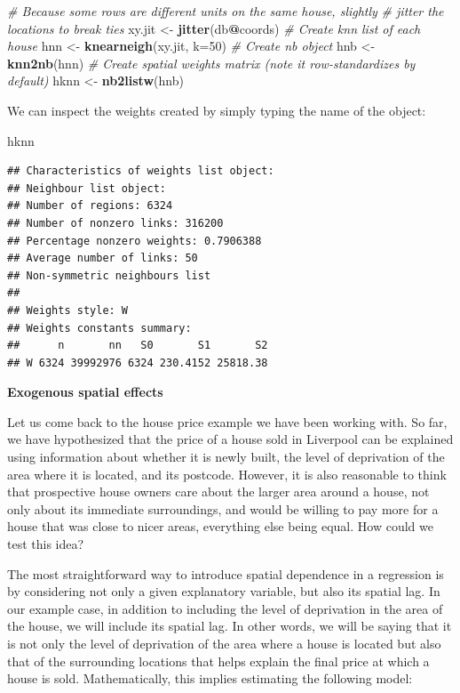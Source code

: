 \documentclass[]{book}
\newenvironment{Shaded}{\begin{snugshade}}{\end{snugshade}}
\newcommand{\KeywordTok}[1]{\textcolor[rgb]{0.13,0.29,0.53}{\textbf{#1}}}
\newcommand{\DataTypeTok}[1]{\textcolor[rgb]{0.13,0.29,0.53}{#1}}
\newcommand{\DecValTok}[1]{\textcolor[rgb]{0.00,0.00,0.81}{#1}}
\newcommand{\StringTok}[1]{\textcolor[rgb]{0.31,0.60,0.02}{#1}}
\newcommand{\CommentTok}[1]{\textcolor[rgb]{0.56,0.35,0.01}{\textit{#1}}}
\newcommand{\OperatorTok}[1]{\textcolor[rgb]{0.81,0.36,0.00}{\textbf{#1}}}
\newcommand{\NormalTok}[1]{#1}
\begin{document}
\begin{Shaded}
\begin{Highlighting}[]
\CommentTok{# Because some rows are different units on the same house, slightly}
\CommentTok{# jitter the locations to break ties}
\NormalTok{xy.jit <-}\StringTok{ }\KeywordTok{jitter}\NormalTok{(db}\OperatorTok{@}\NormalTok{coords)}
\CommentTok{# Create knn list of each house}
\NormalTok{hnn <-}\StringTok{ }\KeywordTok{knearneigh}\NormalTok{(xy.jit, }\DataTypeTok{k=}\DecValTok{50}\NormalTok{)}
\CommentTok{# Create nb object}
\NormalTok{hnb <-}\StringTok{ }\KeywordTok{knn2nb}\NormalTok{(hnn)}
\CommentTok{# Create spatial weights matrix (note it row-standardizes by default)}
\NormalTok{hknn <-}\StringTok{ }\KeywordTok{nb2listw}\NormalTok{(hnb)}
\end{Highlighting}
\end{Shaded}

We can inspect the weights created by simply typing the name of the
object:

\begin{Shaded}
\begin{Highlighting}[]
\NormalTok{hknn}
\end{Highlighting}
\end{Shaded}

\begin{verbatim}
## Characteristics of weights list object:
## Neighbour list object:
## Number of regions: 6324 
## Number of nonzero links: 316200 
## Percentage nonzero weights: 0.7906388 
## Average number of links: 50 
## Non-symmetric neighbours list
## 
## Weights style: W 
## Weights constants summary:
##      n       nn   S0       S1       S2
## W 6324 39992976 6324 230.4152 25818.38
\end{verbatim}

\textbf{Exogenous spatial effects}

Let us come back to the house price example we have been working with.
So far, we have hypothesized that the price of a house sold in Liverpool
can be explained using information about whether it is newly built, the
level of deprivation of the area where it is located, and its postcode.
However, it is also reasonable to think that prospective house owners
care about the larger area around a house, not only about its immediate
surroundings, and would be willing to pay more for a house that was
close to nicer areas, everything else being equal. How could we test
this idea?

The most straightforward way to introduce spatial dependence in a
regression is by considering not only a given explanatory variable, but
also its spatial lag. In our example case, in addition to including the
level of deprivation in the area of the house, we will include its
spatial lag. In other words, we will be saying that it is not only the
level of deprivation of the area where a house is located but also that
of the surrounding locations that helps explain the final price at which
a house is sold. Mathematically, this implies estimating the following
model:
\end{document}
